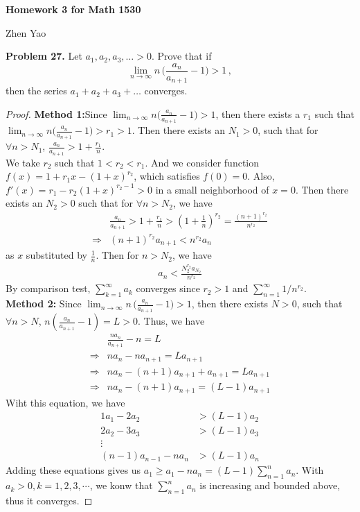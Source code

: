 \documentclass[12pt,leqno]{amsart}
\begin{document}
\centerline{\bf Homework 3 for Math 1530}
\centerline{Zhen Yao}


\bigskip


\noindent
{\bf Problem 27.}
Let $a_1, a_2, a_3,\ldots>0$. Prove that if
$$
\lim_{n\to\infty} n\, \Big( \frac{a_n}{a_{n+1}} - 1\Big) >1\, ,
$$
then the series $a_1+a_2+a_3+\ldots$ converges.

\begin{proof}
{\bf Method 1:}Since $\lim_{n\to\infty} n \Big( \frac{a_n}{a_{n+1}} - 1\Big) >1$, then there exists a $r_1$ such that $\lim_{n\to\infty} n \Big( \frac{a_n}{a_{n+1}} - 1\Big) >r_1>1$. Then there exists an $N_1>0$, such that for $\forall n>N_1$, $\frac{a_n}{a_{n+1}}>1+\frac{r_1}{n}$. \\
\hspace*{3em}We take $r_2$ such that $1<r_2<r_1$. And we consider function $f(x)=1+r_1x-(1+x)^{r_2}$, which satisfies $f(0)=0$. Also, $f'(x)=r_1-r_2(1+x)^{r_2-1}>0$ in a small neighborhood of $x=0$. Then there exists an $N_2>0$ such that for $\forall n>N_2$, we have
\begin{align*}
    & \frac{a_n}{a_{n+1}}> 1+\frac{r_1}{n} > \left(1+\frac{1}{n} \right)^{r_2} = \frac{(n+1)^{r_2}}{n^{r_2}} \\
    \Rightarrow & (n+1)^{r_2} a_{n+1} < n^{r_2}a_n
\end{align*}
as $x$ substituted by $\frac{1}{n}$. Then for $n>N_2$, we have 
\begin{align*}
    a_n < \frac{N_2^{r_2}a_{N_2}}{n^{r_2}}
\end{align*}
By comparison test, $\sum^\infty_{k=1} a_k$ converges since $r_2>1$ and $\sum^\infty_{n=1} 1/n^{r_2}$. \\
\medskip
{\bf Method 2:} Since $\lim_{n\to\infty} n\, \Big( \frac{a_n}{a_{n+1}} - 1\Big) >1$, then there exists $N>0$, such that $\forall n>N$, $n\left(\frac{a_n}{a_{n+1}}-1 \right)=L>0$. Thus, we have
\begin{align*}
    & \frac{na_n}{a_{n+1}}-n = L\\
    \Rightarrow & na_n - na_{n+1} = L a_{n+1} \\
    \Rightarrow & na_n - (n+1)a_{n+1} + a_{n+1} = La_{n+1} \\
    \Rightarrow & na_n - (n+1)a_{n+1}  = (L-1)a_{n+1}
\end{align*}
Wiht this equation, we have 
\begin{align*}
    1 a_1 - 2a_2 & > (L-1)a_2 \\
    2 a_2 - 3a_3 & > (L-1)a_3 \\
    \vdots \\
    (n-1)a_{n-1} - na_n & > (L-1)a_n
\end{align*}
Adding these equations gives us $a_1 \geq a_1 - na_n = (L-1)\sum^n_{n=1}a_n$. With $a_k >0, k=1,2,3,\cdots$, we konw that $\sum^n_{n=1}a_n$ is increasing and bounded above, thus it converges.
\end{proof}
\end{document}
